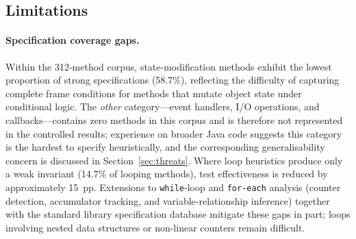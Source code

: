 \documentclass[11pt]{article}
\begin{document}
\subsection{Limitations}

\paragraph{Specification coverage gaps.} Within the 312-method corpus, state-modification methods exhibit the lowest proportion of strong specifications (58.7\%), reflecting the difficulty of capturing complete frame conditions for methods that mutate object state under conditional logic. The \emph{other} category---event handlers, I/O operations, and callbacks---contains zero methods in this corpus and is therefore not represented in the controlled results; experience on broader Java code suggests this category is the hardest to specify heuristically, and the corresponding generalisability concern is discussed in Section~\ref{sec:threats}. Where loop heuristics produce only a weak invariant (14.7\% of looping methods), test effectiveness is reduced by approximately 15~pp. Extensions to \texttt{while}-loop and \texttt{for-each} analysis (counter detection, accumulator tracking, and variable-relationship inference) together with the standard library specification database mitigate these gaps in part; loops involving nested data structures or non-linear counters remain difficult.
\end{document}
